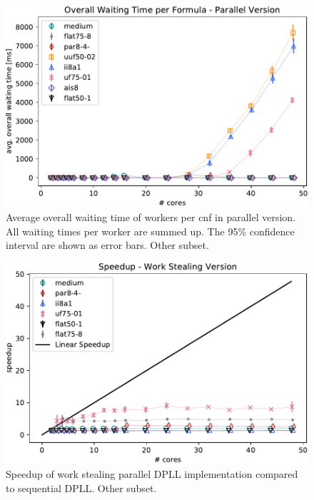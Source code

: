 \documentclass[letterpaper]{article}
\begin{document}
\begin{figure}[h]
    \centering
    \includegraphics[width=\columnwidth]{figures/waiting_parallel_non_subset_dpll_scaling_tar.pdf}
    \caption{Average overall waiting time of workers per cnf in parallel version.
    All waiting times per worker are summed up.
    The 95\% confidence interval are shown as error bars.
    Other subset.}
    \label{fig:dpll_parallel_waiting_non}
\end{figure}

\begin{figure}[h]
    \centering
    \includegraphics[width=\columnwidth]{figures/scaling_stealing_non_subset_dpll_scaling_tar.pdf}
    \caption{Speedup of work stealing parallel DPLL implementation compared to sequential DPLL.
    Other subset.}
    \label{fig:dpll_stealing_speedup_non}
\end{figure}
\end{document}
